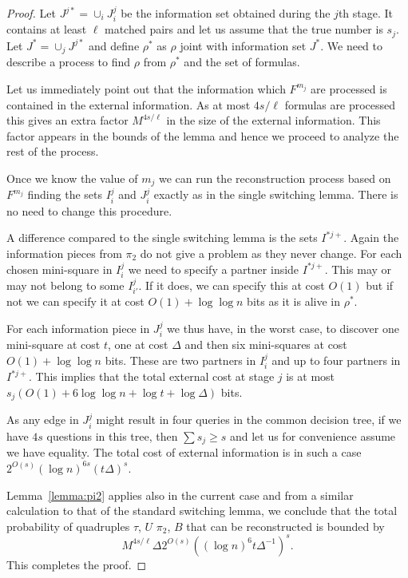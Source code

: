\documentclass{article}\usepackage[a4paper,margin=20mm]{geometry}
\begin{document}
\begin{proof}
Let $J^{j*}=\cup_{i} J_i^j$ be the information set obtained
during the $j$th stage.
It contains at least $\ell$ matched
pairs and let us assume that the true number is $s_j$. 
Let  $J^*=\cup_j J^{j*}$ and define $\rho^*$ as
$\rho$ joint with information set $J^*$.  
We need to describe a process to find $\rho$
from $\rho^*$ and the set of formulas.

Let us
immediately point out that the information which $F^{m_j}$
are processed is contained in the external information.
As at most $4s/\ell$ formulas are processed this gives an
extra factor $M^{4s / \ell}$ in the size of the external
information.  This factor appears in the bounds of the
lemma and hence we proceed to analyze the rest of the
process.

Once we know the value of $m_j$ we can run the
reconstruction process based on  $F^{m_j}$ finding the
sets $I_i^j$ and $J_i^j$ exactly
as in the single switching lemma. There is no need to change
this procedure.

A difference compared to the single switching lemma is
the sets $I^{*j+}$.  Again the information pieces from
$\pi_2$ do not give a problem as they never change.
For each chosen mini-square in $I_i^j$ we need to specify a partner 
inside $I^{*j+}$.  This may or may not belong to some $I_{i'}^j$.
If it does, we can specify this at cost $O(1)$ but if not
we can specify it at cost $O(1)+ \log \log n$ bits as it is alive
in $\rho^*$.

For each information piece in $J_i^j$ we thus have,
in the worst case, to discover one mini-square
at cost $t$, one at cost $\Delta$ and then
six mini-squares at cost $O(1)+\log \log n$ bits.  These
are two partners in $I_i^j$ and up to four
partners in $I^{*j+}$.
This implies that the total external cost at stage
$j$ is at most $s_j(O(1)+6 \log \log n+\log t + \log {\Delta})$ bits.

As any edge in $J_i^j$ might result in four queries in the
common decision tree, if we have $4s$ questions in
this tree, then $\sum s_j\geq s$ and let us for convenience
assume we have equality.  The total cost of external information
is in such a case $2^{O(s)} (\log n)^{6s} (t \Delta)^s$.

Lemma~\ref{lemma:pi2} applies also in the current case and from 
a similar calculation to that of the standard
switching lemma, we conclude that the total probability
of quadruples $\tau$, $U$ $\pi_2$, $B$
that can be reconstructed is bounded by 
$$M^{4s/\ell}\Delta 2^{O(s)} ((\log n)^{6} t \Delta^{-1})^s.$$
This completes the proof.
\end{proof}
\end{document}

